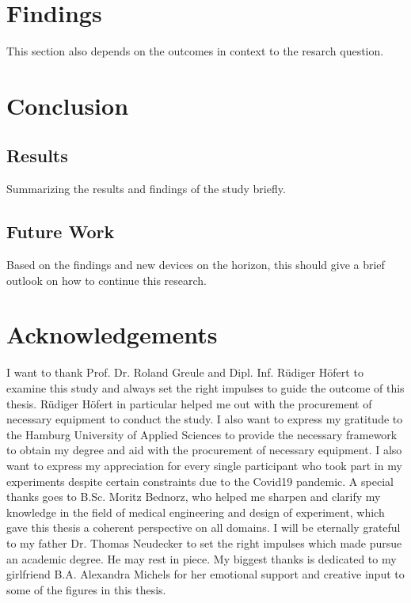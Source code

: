    \chapter{Findings}

        This section also depends on the outcomes in context to the resarch question.

    \chapter{Conclusion}

        \section{Results}

            Summarizing the results and findings of the study briefly.

        \section{Future Work}


            Based on the findings and new devices on the horizon, this should give a brief outlook on how to continue this research.

    \chapter{Acknowledgements}

        I want to thank Prof. Dr. Roland Greule and Dipl. Inf. Rüdiger Höfert to examine this study and always set the right impulses to guide the outcome of this thesis. Rüdiger Höfert in particular helped me out with the procurement of necessary equipment to conduct the study. I also want to express my gratitude to the Hamburg University of Applied Sciences to provide the necessary framework to obtain my degree and aid with the procurement of necessary equipment. I also want to express my appreciation for every single participant who took part in my experiments despite certain constraints due to the Covid19 pandemic.
        A special thanks goes to B.Sc. Moritz Bednorz, who helped me sharpen and clarify my knowledge in the field of medical engineering and design of experiment, which gave this thesis a coherent perspective on all domains. 
        I will be eternally grateful to my father Dr. Thomas Neudecker to set the right impulses which made pursue an academic degree. He may rest in piece. 
        My biggest thanks is dedicated to my girlfriend B.A. Alexandra Michels for her emotional support and creative input to some of the figures in this thesis.

